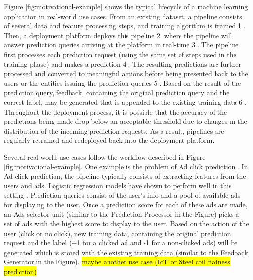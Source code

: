 Figure \ref{fig:motivational-example} shows the typical lifecycle of a machine learning application in real-world use cases.
From an existing dataset, a pipeline consists of several data and feature processing steps, and training algorithm is trained \textcircled{1}.
Then, a deployment platform deploys this pipeline \textcircled{2} where the pipeline will answer prediction queries arriving at the platform in real-time \textcircled{3}.
The pipeline first processes each prediction request (using the same set of steps used in the training phase) and makes a prediction \textcircled{4}.
The resulting predictions are further processed and converted to meaningful actions before being presented back to the users or the entities issuing the prediction queries  \textcircled{5}.
Based on the result of the prediction query, feedback, containing the original prediction query and the correct label, may be generated that is appended to the existing training data \textcircled{6}.
Throughout the deployment process, it is possible that the accuracy of the predictions being made drop below an acceptable threshold due to changes in the distribution of the incoming prediction requests.
As a result, pipelines are regularly retrained and redeployed back into the deployment platform.

Several real-world use cases follow the workflow described in Figure \ref{fig:motivational-example}.
One example is the problem of Ad click prediction \cite{macmahan2013}.
In Ad click prediction, the pipeline typically consists of extracting features from the users and ads. 
Logistic regression models have shown to perform well in this setting \cite{macmahan2013}.
Prediction queries consist of the user's info and a pool of available ads for displaying to the user.
Once a prediction score for each of these ads are made, an Ads selector unit (similar to the Prediction Processor in the Figure) picks a set of ads with the highest score to display to the user.
Based on the action of the user (click or no click), new training data, containing the original prediction request and the label (+1 for a clicked ad and -1 for a non-clicked ads) will be generated which is stored with the existing training data (similar to the Feedback Generator in the Figure).
\hl{maybe another use case (IoT or Steel coil flatness prediction)}

